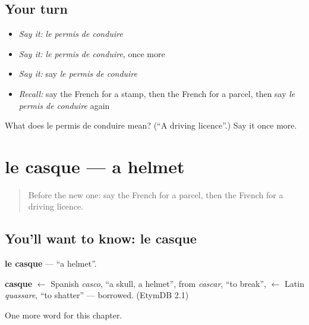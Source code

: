 \subsection*{Your turn}
\begin{itemize}
\raggedright
  \item \emph{Say it:} \emph{le permis de conduire}
  \item \emph{Say it:} \emph{le permis de conduire}, once more
  \item \emph{Say it:} say \emph{le permis de conduire}
  \item \emph{Recall:} say the French for a stamp, then the French for a parcel, then say \emph{le permis de conduire} again
\end{itemize}

\begin{tcolorbox}[breakable,colback=teal!4,colframe=teal!35!black,title={Before you move on}]
What does le permis de conduire mean? (\textquotedblleft{}A driving licence\textquotedblright{}.) Say it once more.
\end{tcolorbox}
\section[le casque]{le casque — a helmet}

\label{lesson:FR-C253-casque}



\begin{quote}
Before the new one: say the French for a parcel, then the French for a driving licence.
\end{quote}

\subsection*{You'll want to know: le casque}
\textbf{le casque} — \textquotedblleft{}a helmet\textquotedblright{}.

\begin{cousinweb}
\textbf{casque} $\leftarrow$ Spanish \emph{casco}, \textquotedblleft{}a skull, a helmet\textquotedblright{}, from \emph{cascar}, \textquotedblleft{}to break\textquotedblright{}, $\leftarrow$ Latin \emph{quassare}, \textquotedblleft{}to shatter\textquotedblright{} — borrowed. (EtymDB 2.1)
\end{cousinweb}

\begin{grammarlens}[title={What you've built}]
One more word for this chapter.
\end{grammarlens}

